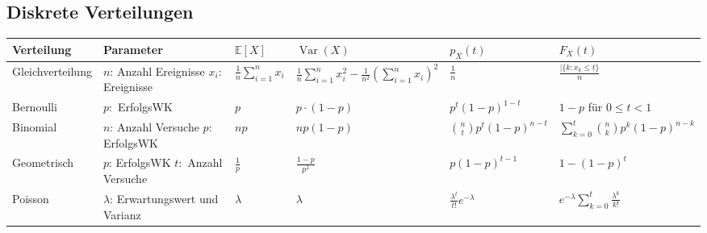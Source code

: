 \documentclass[a4paper,10pt]{article}
\def\E{\mathbb{E}}
\DeclareMathOperator{\Var}{\text{Var}}
\begin{document}
\subsection{Diskrete Verteilungen}
\begin{center}
	\begin{tabularx}{\textwidth}{llXXXX}
		\toprule
		Verteilung & Parameter & \( \E[X] \) & \( \Var(X) \) & \( p_X(t) \) & \( F_X(t) \) \\
		\midrule
		Gleichverteilung & \makecell[l]{\( n \): Anzahl Ereignisse \\ \( x_i \): Ereignisse} & \( \frac{1}{n} \sum_{i=1}^{n} x_i \) & \( \frac{1}{n} \sum_{i=1}^{n} x_i^2 - \frac{1}{n^2} \left(\sum_{i=1}^{n} x_i \right)^2 \) & \( \frac{1}{n} \) & \( \frac{|\{k:x_k \leq t\}}{n} \) \\

		Bernoulli & \( p: \) ErfolgsWK & \( p \) & \( p \cdot (1-p) \) & \( p^t(1-p)^{1-t} \) & \( 1-p \) für \( 0 \leq t < 1 \) \\

		Binomial & \makecell[l] {\( n \): Anzahl Versuche \\ \( p: \) ErfolgsWK } & \( np \) & \( np(1-p) \) & \( \binom{n}{t}p^t(1-p)^{n-t} \) & \( \sum_{k=0}^{t} \binom{n}{k} p^k(1-p)^{n-k} \)  \\

		Geometrisch & \makecell[l] { \( p \): ErfolgsWK \\ \( t: \) Anzahl Versuche} & \( \frac{1}{p} \) & \( \frac{1-p}{p^2} \) & \( p(1-p)^{t-1} \) & \( 1-(1-p)^t\) \\

		Poisson & \makecell[l]{ \( \lambda \): Erwartungswert \\ und Varianz} & \( \lambda \) & \( \lambda \) & \( \frac{\lambda^t}{t!}e^{-\lambda} \) & \( e^{-\lambda} \sum_{k=0}^{t} \frac{\lambda^{k}}{k!} \) \\

		\bottomrule

	\end{tabularx}
\end{center}

\bigskip
\end{document}
